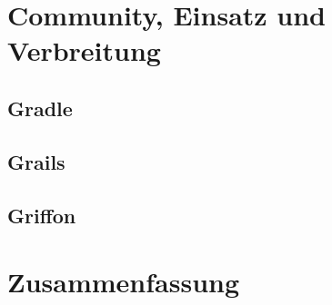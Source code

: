 

\section{Community, Einsatz und Verbreitung}\label{sec:community}


\subsection{Gradle}\label{subsec:gradle}


\subsection{Grails}\label{subsec:grails}


\subsection{Griffon}\label{subsec:griffon}



\section{Zusammenfassung}\label{sec:zusammenfassung}







